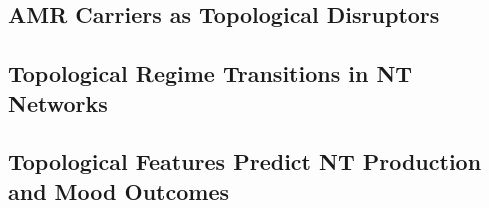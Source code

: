 \subsection{AMR Carriers as Topological Disruptors}
\label{subsec:amr_results}

\subsection{Topological Regime Transitions in NT Networks}
\label{subsec:regime_results}

\subsection{Topological Features Predict NT Production and Mood Outcomes}
\label{subsec:prediction_results}
